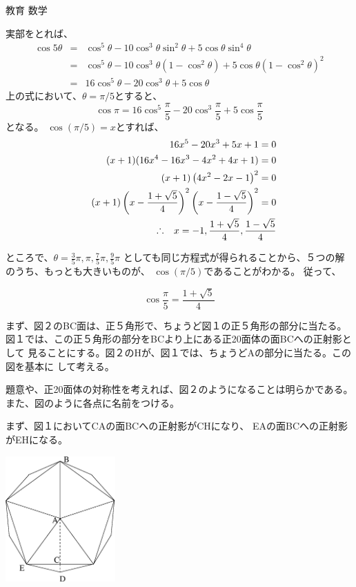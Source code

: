 \documentclass[fleqn]{jbook}
\begin{document}
\begin{answer}{教育 数学}{}
\begin{subanswers}
\begin{subsubanswers}
実部をとれば、
\begin{eqnarray*}
\cos5\theta&=&\cos^5\theta-10\cos^3\theta\sin^2\theta+5\cos\theta
\sin^4\theta\\
&=&\cos^5\theta-10\cos^3\theta(1-\cos^2\theta)+5\cos\theta(
1-\cos^2\theta)^2\\
&=&16\cos^5\theta-20\cos^3\theta+5\cos\theta
\end{eqnarray*}
\SubSubAnswer
 上の式において、$\theta=\pi/5$とすると、
\[\cos\pi=16\cos^5\frac{\pi}{5}-20\cos^3\frac{\pi}{5}+5
\cos\frac{\pi}{5}\]
となる。
$\cos(\pi/5)=x$とすれば、
\begin{eqnarray*}
&&16x^5-20x^3+5x+1=0 \\
&&(x+1)(16x^4-16x^3-4x^2+4x+1)=0\\
&&(x+1)\left(4x^2-2x-1\right)^2=0\\
&&(x+1)\left(x-\frac{1+\sqrt{5}}{4}\right)^2\left(
x-\frac{1-\sqrt{5}}{4}\right)^2=0\\
&&\Yueni x=-1,\frac{1+\sqrt{5}}{4},\frac{1-\sqrt{5}}{4}
\end{eqnarray*}

ところで、$\theta=\frac{3}{5}\pi,\pi,\frac{7}{5}\pi,\frac{9}{5}\pi$
としても同じ方程式が得られることから、５つの解のうち、もっとも大きいものが、
$\cos(\pi/5)$であることがわかる。
従って、

\[\cos\frac{\pi}{5}=\frac{1+\sqrt{5}}{4}\]

\SubSubAnswer 
 まず、図２のBC面は、正５角形で、ちょうど図１の正５角形の部分に当たる。
図１では、この正５角形の部分をBCより上にある正20面体の面BCへの正射影として
見ることにする。図２のHが、図１では、ちょうどAの部分に当たる。この図を基本に
して考える。

題意や、正20面体の対称性を考えれば、図２のようになることは明らかである。また、図のように各点に名前をつける。

まず、図１においてCAの面BCへの正射影がCHになり、
EAの面BCへの正射影がEHになる。

\parbox[t]{80mm}{
\begin{center}
%
\includegraphics[clip,height=48mm,width=42mm]{1992math-3.eps}


\end{center}}
\end{subsubanswers}
\end{subanswers}
\end{answer}
\end{document}
